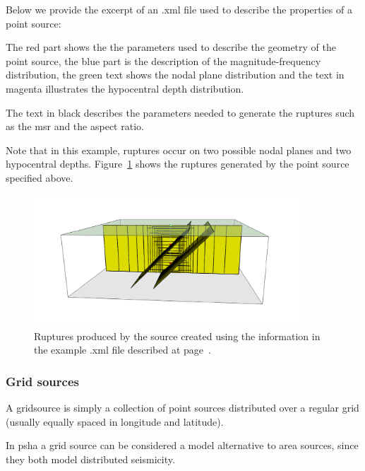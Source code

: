 Below we provide the excerpt of an .xml file used to describe the properties
of a point source:


\label{page:point_source_nrml}

The red part shows the the parameters used to describe the geometry of the
point source, the blue part is the description of the magnitude-frequency
distribution, the green text shows the nodal plane distribution and the text
in magenta illustrates the hypocentral depth distribution.

The text in black describes the parameters needed to generate the ruptures
such as the \gls{msr} and the aspect ratio.

Note that in this example, ruptures occur on two possible nodal planes and
two hypocentral depths. Figure~\ref{fig:point_source_ruptures} shows the
ruptures generated by the point source specified above.

\begin{figure}[!ht]
\centering
\includegraphics[width=10cm]{figures/hazard/pointsrc_2strike_2hypodep.pdf}
\caption{Ruptures produced by the source created using the information 
in the example .xml file described at page~\pageref{page:point_source_nrml}.}
\label{fig:point_source_ruptures}
\end{figure}



\subsubsection{Grid sources}
\label{subsubsec:grid_sources}

A \gls{gridsource} is simply a collection of point sources distributed over a
regular grid (usually equally spaced in longitude and latitude).

In \gls{psha} a grid source can be considered a model alternative to area
sources, since they both model distributed seismicity.

